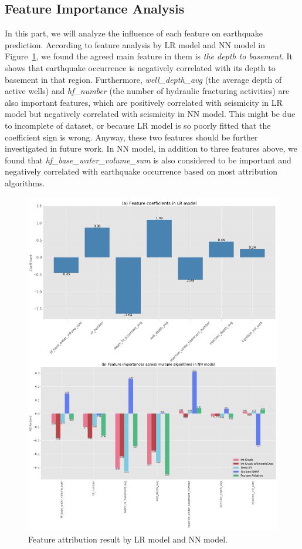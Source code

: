 \documentclass[final-report]{report-template}
\begin{document}
\subsection{Feature Importance Analysis}
In this part, we will analyze the influence of each feature on earthquake prediction.
According to feature analysis by LR model and NN model in Figure~\ref{fig:feature_attribution}, we found the agreed main feature in them is \textit{the depth to basement}.
It shows that earthquake occurrence is negatively correlated with its depth to basement in that region.
Furthermore, \textit{well\_depth\_avg} (the average depth of active wells) and \textit{hf\_number} (the number of hydraulic fracturing activities) are also important features, which are positively correlated with seismicity in LR model but negatively correlated with seismicity in NN model.
This might be due to incomplete of dataset, or because LR model is so poorly fitted that the coefficient sign is wrong. Anyway, these two features should be further investigated in future work.
In NN model, in addition to three features above, we found that \textit{hf\_base\_water\_volume\_sum} is also considered to be important and negatively correlated with earthquake occurrence based on most attribution algorithms.
\begin{figure}
    \begin{center}
        \includegraphics[width=1\textwidth]{feature_attribution.png}
    \end{center}
    \caption{\label{fig:feature_attribution} Feature attribution result by LR model and NN model.}
\end{figure}
\end{document}
